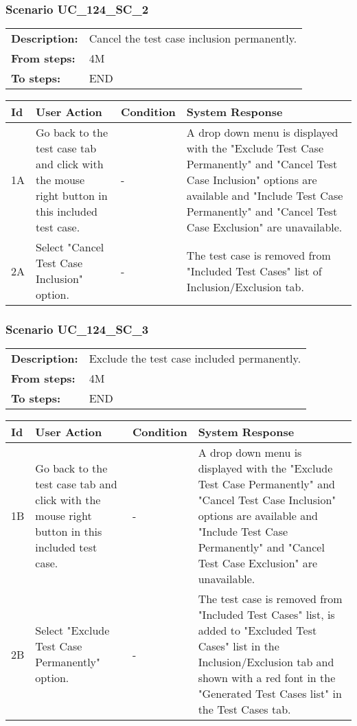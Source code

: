 \documentclass[a4paper,11pt]{article}
\newcommand{\bl}{\\ \hline}
\begin{document}
\subsubsection*{Scenario UC_124_SC_2}
\begin{tabular}{p{1in}p{4in}}
{\bf Description:} & Cancel the test case inclusion permanently. \\
{\bf From steps:} & 4M \\
{\bf To steps:} & END \\
\end{tabular}
 
\begin{tabular}{|p{0.8in}|p{1.6in}|p{1.6in}|p{1.6in}|}
\hline
Id & User Action & Condition & System Response  \bl 
1A & Go back to the test case tab and click with the mouse right button in this included test case. & - & A drop down menu is displayed with the "Exclude Test Case Permanently" and "Cancel Test Case Inclusion" options are available and "Include Test Case Permanently" and "Cancel Test Case Exclusion" are unavailable. \bl 
2A & Select "Cancel Test Case Inclusion" option. & - & The test case is removed from "Included Test Cases" list of Inclusion/Exclusion tab. \bl 
\end{tabular}
\subsubsection*{Scenario UC_124_SC_3}
\begin{tabular}{p{1in}p{4in}}
{\bf Description:} & Exclude the test case included permanently. \\
{\bf From steps:} & 4M \\
{\bf To steps:} & END \\
\end{tabular}
 
\begin{tabular}{|p{0.8in}|p{1.6in}|p{1.6in}|p{1.6in}|}
\hline
Id & User Action & Condition & System Response  \bl 
1B & Go back to the test case tab and click with the mouse right button in this included test case. & - & A drop down menu is displayed with the "Exclude Test Case Permanently" and "Cancel Test Case Inclusion" options are available and "Include Test Case Permanently" and "Cancel Test Case Exclusion" are unavailable. \bl 
2B & Select "Exclude Test Case Permanently" option. & - & The test case is removed from "Included Test Cases" list, is added to "Excluded Test Cases" list in the Inclusion/Exclusion tab and shown with a red font in the "Generated Test Cases list" in the Test Cases tab. \bl 
\end{tabular}
\end{document}
